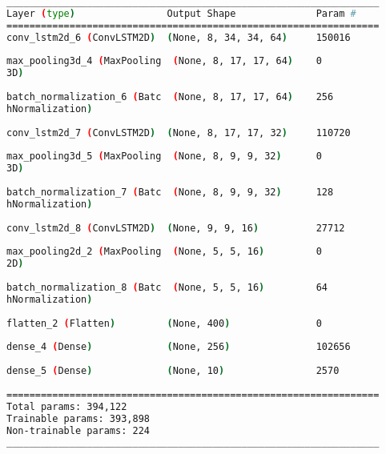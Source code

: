 \begin{lstlisting}[language=Bash,caption={Overview of layers in Convolutional LTSM network.},label={lst:conv_lstm_layers},numbers=none,float=htb]
_________________________________________________________________
Layer (type)                Output Shape              Param #   
=================================================================
conv_lstm2d_6 (ConvLSTM2D)  (None, 8, 34, 34, 64)     150016    
                                                                
max_pooling3d_4 (MaxPooling  (None, 8, 17, 17, 64)    0         
3D)                                                             
                                                                
batch_normalization_6 (Batc  (None, 8, 17, 17, 64)    256       
hNormalization)                                                 
                                                                
conv_lstm2d_7 (ConvLSTM2D)  (None, 8, 17, 17, 32)     110720    
                                                                
max_pooling3d_5 (MaxPooling  (None, 8, 9, 9, 32)      0         
3D)                                                             
                                                                
batch_normalization_7 (Batc  (None, 8, 9, 9, 32)      128       
hNormalization)                                                 
                                                                
conv_lstm2d_8 (ConvLSTM2D)  (None, 9, 9, 16)          27712     
                                                                
max_pooling2d_2 (MaxPooling  (None, 5, 5, 16)         0         
2D)                                                             
                                                                
batch_normalization_8 (Batc  (None, 5, 5, 16)         64        
hNormalization)                                                 
                                                                
flatten_2 (Flatten)         (None, 400)               0         
                                                                
dense_4 (Dense)             (None, 256)               102656    
                                                                
dense_5 (Dense)             (None, 10)                2570      
                                                                
=================================================================
Total params: 394,122
Trainable params: 393,898
Non-trainable params: 224
_________________________________________________________________
\end{lstlisting}

